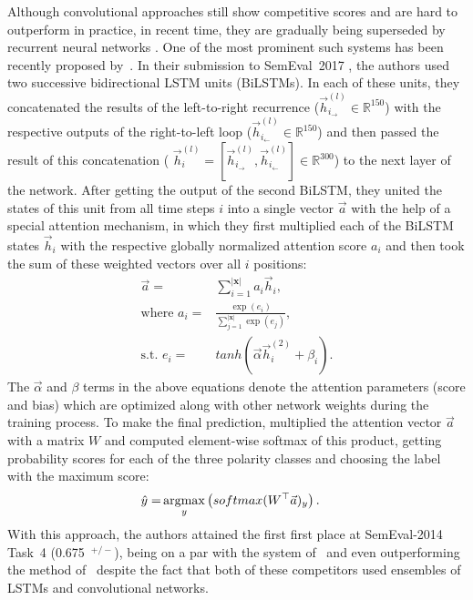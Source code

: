 Although convolutional approaches still show competitive scores and
are hard to outperform in practice, in recent time, they are gradually
being superseded by recurrent neural networks \cite{Xu:16,Wang:15}.
One of the most prominent such systems has been recently proposed
by~\citet{Baziotis:17}.  In their submission to SemEval~2017
\cite{Rosenthal:17}, the authors used two successive bidirectional
LSTM units (BiLSTMs).  In each of these units, they concatenated the
results of the left-to-right recurrence
($\vec{h}^{(l)}_{i_{\rightarrow}}\in\mathbb{R}^{150}$) with the
respective outputs of the right-to-left loop
($\vec{h}^{(l)}_{i_{\leftarrow}}\in\mathbb{R}^{150}$) and then passed
the result of this concatenation ( $\vec{h}_i^{(l)} =
[\vec{h}^{(l)}_{i_{\rightarrow}},
  \vec{h}^{(l)}_{i_{\leftarrow}}]\in\mathbb{R}^{300}$) to the next
layer of the network.  After getting the output of the second BiLSTM,
they united the states of this unit from all time steps $i$ into a
single vector $\vec{a}$ with the help of a special attention
mechanism, in which they first multiplied each of the BiLSTM states
$\vec{h}_i$ with the respective globally normalized attention score
$a_i$ and then took the sum of these weighted vectors over all $i$
positions:
\begin{align}
  \vec{a} =&
  \sum_{i=1}^{|\mathbf{x}|}a_i\vec{h}_i,\nonumber\\ \mbox{where }a_i
  =&
  \frac{\exp(e_i)}{\sum_{j=1}^{|\mathbf{x}|}\exp(e_j)},\nonumber\\ \textrm{s.t. }e_i
  =& tanh\left(\vec{\alpha}\vec{h}^{(2)}_i + \beta_i\right).
\end{align}\label{eq:cgsa:baziotis-attention}%
The $\vec{\alpha}$ and $\beta$ terms in the above equations denote the
attention parameters (score and bias) which are optimized along with
other network weights during the training process.  To make the final
prediction, \citeauthor{Baziotis:17} multiplied the attention vector
$\vec{a}$ with a matrix $W$ and computed element-wise softmax of this
product, getting probability scores for each of the three polarity
classes and choosing the label with the maximum score:
\begin{align}
  \hat{y} =& \argmax_y\left(softmax(W^\top\vec{a})_y\right).
\end{align}
\noindent With this approach, the authors attained the first first
place at SemEval-2014 Task~4 (0.675~\F{}$^{+/-}$), being on a par with
the system of~\citet{Cliche:17} and even outperforming the method
of~\citet{Rouvier:17} despite the fact that both of these competitors
used ensembles of LSTMs and convolutional networks.

